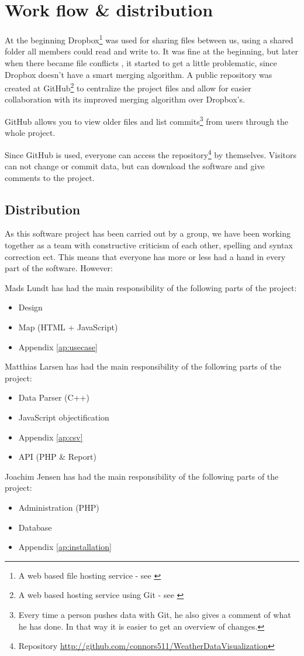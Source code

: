 \chapter{Work flow \& distribution}
\label{sec:work_flow_and_distribution}
At the beginning Dropbox\footnote{A web based file hosting service - see \cite{Dropbox}} was used for sharing files between us, using a shared folder all members could read and write to. It was fine at the beginning, but later when there became file conflicts , it started to get a little problematic, since Dropbox doesn't have a smart merging algorithm.
A public repository was created at GitHub\footnote{A web based hosting service using Git - see \cite{GitHub}} to centralize the project files and allow for easier collaboration with its improved merging algorithm over Dropbox's.

GitHub allows you to view older files and list commits\footnote{Every time a person pushes data with Git, he also gives a comment of what he has done. In that way it is easier to get an overview of changes.} from users through the whole project.

Since GitHub is used, everyone can access the repository\footnote{Repository \url{http://github.com/connors511/WeatherDataVisualization}} by themselves. Visitors can not change or commit data, but can download the software and give comments to the project.

\section{Distribution}
\label{sec:distribution}
As this software project has been carried out by a group, we have been working together as a team with constructive criticism of each other, spelling and syntax correction ect. This means that everyone has more or less had a hand in every part of the software. However:

Mads Lundt has had the main responsibility of the following parts of the project:
\begin{itemize}
\item Design
\item Map (HTML + JavaScript)
\item Appendix \ref{ap:usecase}
\end{itemize}

Matthias Larsen has had the main responsibility of the following parts of the project:
\begin{itemize}
\item Data Parser (C++)
\item JavaScript objectification
\item Appendix \ref{ap:csv}
\item API (PHP \& Report)
\end{itemize}

Joachim Jensen has had the main responsibility of the following parts of the project:
\begin{itemize}
\item Administration (PHP)
\item Database
\item Appendix \ref{ap:installation}
\end{itemize}